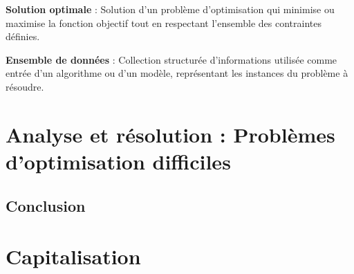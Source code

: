 \vspace{0.5cm}

\noindent \textbf{Solution optimale} : Solution d'un problème d'optimisation qui minimise ou maximise la fonction objectif tout en respectant l'ensemble des contraintes définies.

\vspace{0.5cm}

\noindent \textbf{Ensemble de données} : Collection structurée d'informations utilisée comme entrée d'un algorithme ou d'un modèle, représentant les instances du problème à résoudre.

\newpage

\section*{Analyse et résolution : Problèmes d'optimisation difficiles}

\noindent 

\newpage

\subsection*{Conclusion}
{}

\noindent 

\newpage

\section*{Capitalisation}


